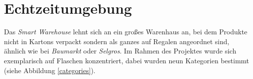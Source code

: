 \section{Echtzeitumgebung}

Das \textit{Smart Warehouse} lehnt sich an ein großes Warenhaus an, bei dem Produkte nicht in Kartons verpackt sondern als ganzes auf Regalen angeordnet sind, ähnlich wie bei \textit{Baumarkt} oder \textit{Selgros}. Im Rahmen des Projektes wurde sich exemplarisch auf Flaschen konzentriert, dabei wurden neun Kategorien bestimmt (siehe Abbildung \ref{categories}). 

\begin{figure}[htb]

\end{figure}

